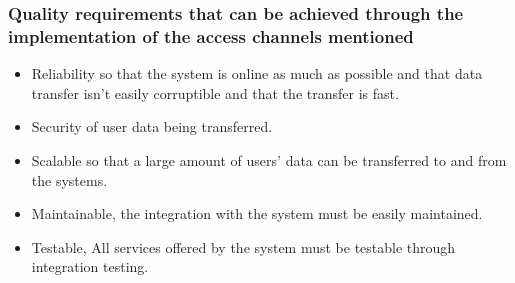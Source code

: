 \documentclass[a4paper]{article}
\begin{document}
\subsubsection{Quality requirements that can be achieved through the implementation of the access channels mentioned}
\begin{itemize}
	\item Reliability so that the system is online as much as possible and that data transfer isn’t easily corruptible and that the transfer is fast.
	\item Security of user data being transferred.
	\item Scalable so that a large amount of users’ data can be transferred to and from the systems.
	\item Maintainable, the integration with the system must be easily maintained.
	\item Testable, All services offered by the system must be testable through integration testing.
\end{itemize}
\end{document}
